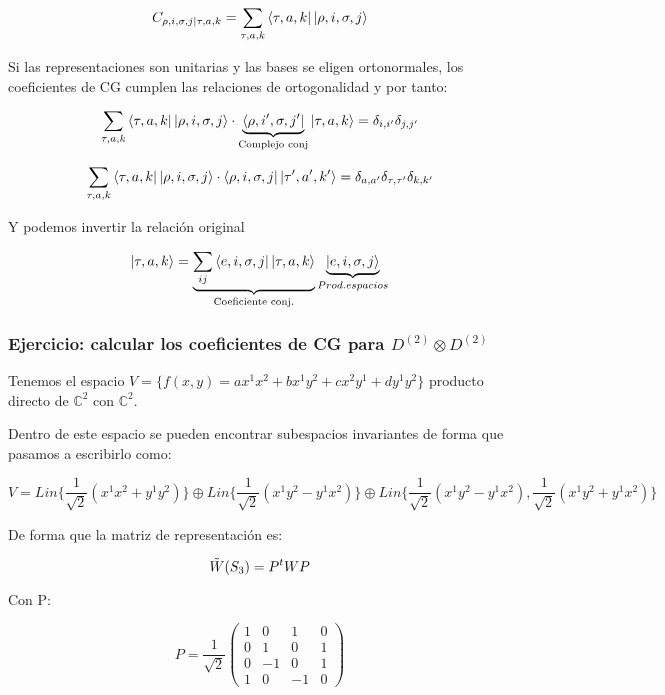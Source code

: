 \documentclass{article}
\begin{document}
$$C_{\rho , i, \sigma, j | \tau, a, k}=\sum_{\tau , a,k}\bra{\tau , a, k}\ket{\rho, i,  \sigma ,j } $$

     \smallskip

     Si las representaciones son unitarias y las bases se eligen ortonormales, los coeficientes de CG cumplen las relaciones de ortogonalidad y por tanto:


    $$\sum_{\tau , a,k}\bra{\tau , a, k}\ket{\rho, i,  \sigma ,j } \cdot \underbrace{\bra{\rho, i',  \sigma ,j '}}_{\text{Complejo conj}} \ket{\tau , a, k}=\delta _{i,i'}\delta _{j,j'}$$

       $$\sum_{\tau , a,k}\bra{\tau , a, k}\ket{\rho, i,  \sigma ,j } \cdot {\bra{\rho, i,  \sigma ,j }} \ket{\tau ' , a', k'}=\delta _{a,a'}\delta _{\tau,\tau '}\delta _{k, k'}$$


       Y podemos invertir la relación original

       $$\ket{\tau, a, k}=\underbrace{\sum _{ij} \bra{e,i, \sigma , j} \ket{ \tau , a ,k}}_{\text{Coeficiente conj.}} \underbrace{\ket{e,i,\sigma ,j}}_{Prod. espacios}$$

            \subsubsection{Ejercicio: calcular los coeficientes de CG para $D^{(2)}\otimes D^{(2)}$}

            Tenemos el espacio $V=\lbrace f(x,y)=ax^1x^2 + bx^1y^2 + c x^2y^1 +d y^1y^2\rbrace$ producto directo de $\mathds{C}^2$ con $\mathds{C}^2$.


        Dentro de este espacio se pueden encontrar subespacios invariantes de forma que pasamos a escribirlo como:


        $$V=Lin \lbrace \frac{1}{\sqrt{2}} (x^1x^2 + y^1y^2) \rbrace \oplus Lin \lbrace \frac{1}{\sqrt{2}}(x^1y^2 - y^1x^2)\rbrace \oplus Lin \lbrace \frac{1}{\sqrt{2}}(x^1y^2 - y^1x^2), \frac{1}{\sqrt{2}}(x^1y^2 + y^1x^2) \rbrace$$


    De forma que la matriz de representación es:

    $$\Tilde{W}(S_3)=P^tWP$$

    Con P:

    $$P=\frac{1}{\sqrt{2}}\left (\begin{array}{cccc}
         1 & 0 & 1 & 0  \\
         0 & 1 & 0 & 1  \\
         0 & -1 & 0 & 1  \\
         1 & 0 & -1 & 0
    \end{array} \right)$$
\end{document}
